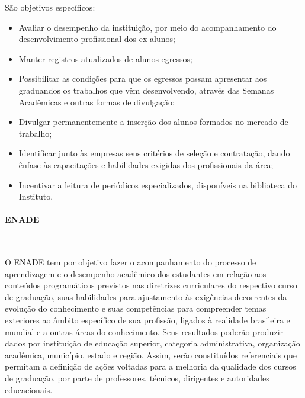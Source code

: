 São objetivos específicos:

\begin{itemize}
\item Avaliar o desempenho da instituição, por meio do acompanhamento do desenvolvimento profissional dos ex-alunos;

\item Manter registros atualizados de alunos egressos;

\item Possibilitar as condições para que os egressos possam apresentar aos graduandos os trabalhos que vêm desenvolvendo, através das Semanas Acadêmicas e outras formas de divulgação;

\item Divulgar permanentemente a inserção dos alunos formados no mercado de trabalho;

\item Identificar junto às empresas seus critérios de seleção e contratação, dando ênfase às capacitações e habilidades exigidas dos profissionais da área;

\item Incentivar a leitura de periódicos especializados, disponíveis na biblioteca do Instituto.
\end{itemize}

\paragraph{ENADE}\

  O ENADE tem por objetivo fazer o acompanhamento do processo de aprendizagem e o desempenho acadêmico dos estudantes em relação aos conteúdos programáticos previstos nas diretrizes curriculares do respectivo curso de graduação, suas habilidades para ajustamento às exigências decorrentes da evolução do conhecimento e suas competências para compreender temas exteriores ao âmbito específico de sua profissão, ligados à realidade brasileira e mundial e a outras áreas do conhecimento. Seus resultados poderão produzir dados por instituição de educação superior, categoria administrativa, organização acadêmica, município, estado e região. Assim, serão constituídos referenciais que permitam a definição de ações voltadas para a melhoria da qualidade dos cursos de graduação, por parte de professores, técnicos, dirigentes e autoridades educacionais. 



